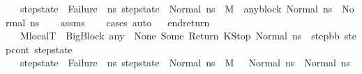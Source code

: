 \begin{isabellebody}
\ \ \ {\isachardoublequoteopen}step{\isacharunderscore}{\kern0pt}state\ {\isasymnoteq}\ Failure\ {\isasymand}\ {\isacharparenleft}{\kern0pt}{\isasymforall}ns{}{\isacharprime}{\kern0pt}{\isachardot}{\kern0pt}\ step{\isacharunderscore}{\kern0pt}state\ {\isacharequal}{\kern0pt}\ Normal\ ns{}{\isacharprime}{\kern0pt}\ {\isasymlongrightarrow}\ M{\isacharcomma}{\kern0pt}{\isasymLambda}{}{\isacharcomma}{\kern0pt}{\isasymGamma}{\isacharcomma}{\kern0pt}{\isacharbrackleft}{\kern0pt}{\isacharbrackright}{\kern0pt}\ {\isasymturnstile}\ {\isasymlangle}any{\isacharunderscore}{\kern0pt}block\ {\isacharcomma}{\kern0pt}Normal\ ns{}{\isasymrangle}\ {\isacharbrackleft}{\kern0pt}{\isasymrightarrow}{\isacharbrackright}{\kern0pt}\ Normal\ ns{}{\isacharprime}{\kern0pt}{\isacharparenright}{\kern0pt}{\isachardoublequoteclose}\isanewline
%
\isadelimproof
\ \ %
\endisadelimproof
%
\isatagproof
{}\isamarkupfalse%
\ assms\isanewline
\ \ \isamarkupfalse%
\ {\isacharparenleft}{\kern0pt}cases{\isacharparenright}{\kern0pt}\ auto%
\endisatagproof
{\isafoldproof}%
%
\isadelimproof
\ \isanewline
%
\endisadelimproof
\isanewline
{}\isamarkupfalse%
\ end{\isacharunderscore}{\kern0pt}return{\isacharcolon}{\kern0pt}\isanewline
\ \ \ {\isachardoublequoteopen}M{\isacharcomma}{\kern0pt}{\isasymLambda}{}{\isacharunderscore}{\kern0pt}local{\isacharcomma}{\kern0pt}{\isasymGamma}{\isacharcomma}{\kern0pt}{\isasymOmega}{\isacharcomma}{\kern0pt}T\ {\isasymturnstile}\ {\isasymlangle}{\isacharparenleft}{\kern0pt}BigBlock\ any\ {\isacharbrackleft}{\kern0pt}{\isacharbrackright}{\kern0pt}\ None\ {\isacharparenleft}{\kern0pt}Some\ Return{\isacharparenright}{\kern0pt}{\isacharcomma}{\kern0pt}\ KStop{\isacharcomma}{\kern0pt}\ Normal\ ns{}{\isacharparenright}{\kern0pt}{\isasymrangle}\ {\isasymlongrightarrow}\ {\isacharparenleft}{\kern0pt}step{\isacharunderscore}{\kern0pt}bb{\isacharcomma}{\kern0pt}\ step{\isacharunderscore}{\kern0pt}cont{\isacharcomma}{\kern0pt}\ step{\isacharunderscore}{\kern0pt}state{\isacharparenright}{\kern0pt}{\isachardoublequoteclose}\isanewline
\ \ \ {\isachardoublequoteopen}step{\isacharunderscore}{\kern0pt}state\ {\isasymnoteq}\ Failure\ {\isasymand}\ {\isacharparenleft}{\kern0pt}{\isasymforall}ns{}{\isacharprime}{\kern0pt}{\isachardot}{\kern0pt}\ step{\isacharunderscore}{\kern0pt}state\ {\isacharequal}{\kern0pt}\ Normal\ ns{}{\isacharprime}{\kern0pt}\ {\isasymlongrightarrow}\ M{\isacharcomma}{\kern0pt}{\isasymLambda}{}{\isacharcomma}{\kern0pt}{\isasymGamma}{\isacharcomma}{\kern0pt}{\isacharbrackleft}{\kern0pt}{\isacharbrackright}{\kern0pt}\ {\isasymturnstile}\ {\isasymlangle}{\isacharbrackleft}{\kern0pt}{\isacharbrackright}{\kern0pt}\ {\isacharcomma}{\kern0pt}Normal\ ns{}{\isasymrangle}\ {\isacharbrackleft}{\kern0pt}{\isasymrightarrow}{\isacharbrackright}{\kern0pt}\ Normal\ ns{}{\isacharprime}{\kern0pt}{\isacharparenright}{\kern0pt}{\isachardoublequoteclose}\isanewline

\end{isabellebody}
